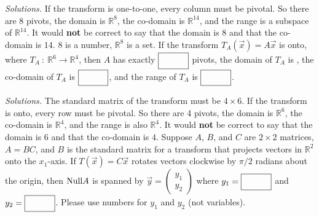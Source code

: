         \ifnum {} {\color{DarkBlue} \textit{Solutions.} 
        If the transform is one-to-one, every column must be pivotal. So there are 8 pivots, the domain is $\mathbb R^{8}$, the co-domain is $\mathbb R^{14}$, and the range is a subspace of $\mathbb R^{14}$. It would \textbf{not} be correct to say that the domain is $8$ and that the co-domain is $14$. $8$ is a number, $\mathbb R^8$ is a set. 
        } 
       \fi      
\fi 
\ifnum {}
        If the transform $T_A(\vec x) = A\vec x$ is onto, where $T_A \ : \ \mathbb R^6 \to \mathbb R^4$, then $A$ has exactly $\framebox{\strut\hspace{1.00cm}}$ pivots, the domain of $T_A$ is \framebox{\strut\hspace{1.00cm}}, the co-domain of $T_A$ is $\framebox{\strut\hspace{1.00cm}}$, and the range of $T_A$ is $\framebox{\strut\hspace{1.00cm}}$. 
        
        \ifnum {} {\color{DarkBlue} \textit{Solutions.} 
        The standard matrix of the transform must be $4\times6$. If the transform is onto, every row must be pivotal. So there are 4 pivots, the domain is $\mathbb R^6$, the co-domain is $\mathbb R^4$, and the range is also $\mathbb R^4$. It would \textbf{not} be correct to say that the domain is $6$ and that the co-domain is $4$. 
        } 
       \fi    
\fi 
\ifnum {}
    Suppose $A$, $B$, and $C$ are $2\times2$ matrices, $A = BC$, and $B$ is the standard matrix for a transform that projects vectors in $\mathbb R^2$ onto the $x_1$-axis. If $T(\vec x)=C\vec x$ rotates vectors clockwise by $\pi/2$ radians about the origin, then $\text{Null} A$ is spanned by $\vec y = \begin{pmatrix} y_1\\y_2\end{pmatrix}$ where $y_1 = \framebox{\strut\hspace{1.0cm}}$ and $y_2 = \framebox{\strut\hspace{1.0cm}}$. Please use numbers for $y_1$ and $y_2$ (not variables). 
    
